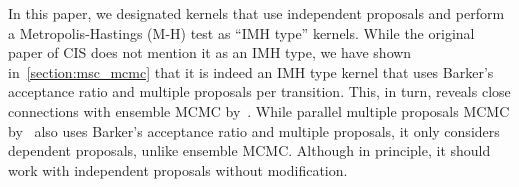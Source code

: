 In this paper, we designated kernels that use independent proposals and perform a Metropolis-Hastings (M-H) test as ``IMH type'' kernels.
While the original paper of CIS does not mention it as an IMH type, we have shown in~\cref{section:msc_mcmc} that it is indeed an IMH type kernel that uses Barker's acceptance ratio and multiple proposals per transition.
This, in turn, reveals close connections with ensemble MCMC by~\citet{neal_mcmc_2011a}.
While parallel multiple proposals MCMC by~\citet{austad_parallel_2007} also uses Barker's acceptance ratio and multiple proposals, it only considers dependent proposals, unlike ensemble MCMC.
Although in principle, it should work with independent proposals without modification.

